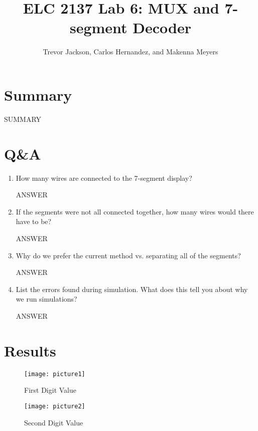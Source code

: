 \documentclass[11pt]{article}
\begin{document}
\title{ELC 2137 Lab 6: MUX and 7-segment Decoder}
\author{Trevor Jackson, Carlos Hernandez, and Makenna Meyers}

\maketitle


\section*{Summary}

SUMMARY

\section*{Q\&A}

\begin{enumerate}
	\item How many wires are connected to the 7-segment display?
	
	ANSWER
	
	\item If the segments were not all connected together, how many wires would there have to be?

    ANSWER
    
    \item Why do we prefer the current method vs. separating all of the segments?
    
    ANSWER
    
    \item List the errors found during simulation. What does this tell you about why we run simulations?
    
    ANSWER
	
\end{enumerate}

\section*{Results}

\begin{figure}\centering
	\texttt{[image: picture1]}
	\caption{First Digit Value}
	\label{fig:picture1}	
\end{figure}

\begin{figure}\centering
	\texttt{[image: picture2]}
	\caption{Second Digit Value}
	\label{fig:picture2}	
\end{figure}
\end{document}
